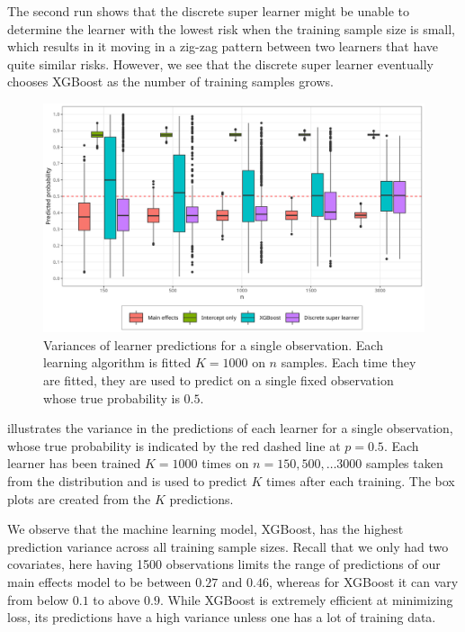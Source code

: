 \documentclass[./main.tex]{subfiles}
\begin{document}
The second run shows that the discrete super learner might be unable to determine the learner with the lowest risk when the training sample size is small, which results in it moving in a zig-zag pattern between two learners that have quite similar risks. However, we see that the discrete super learner eventually chooses XGBoost as the number of training samples grows.  

\begin{figure}[H]
    \centering
    \includegraphics[width=\textwidth]{figures/learner_vars.png}
    \caption{Variances of learner predictions for a single observation. Each learning algorithm is fitted $ K = 1000 $ on $n$ samples. Each time they are fitted, they are used to predict on a single fixed observation whose true probability is $ 0.5 $.}
    \label{fig:pred_probs_boxplot}
\end{figure}
 illustrates the variance in the predictions of each learner for a single observation, whose true probability is indicated by the red dashed line at $ p = 0.5 $. Each learner has been trained $ K = 1000 $ times on $ n = 150, 500, \dots 3000 $ samples taken from the distribution and is used to predict $ K $ times after each training. The box plots are created from the $ K $ predictions. 

We observe that the machine learning model, XGBoost, has the highest prediction variance across all training sample sizes. Recall that we only had two covariates, here having 1500 observations limits the range of predictions of our main effects model to be between $ 0.27 $ and $ 0.46 $, whereas for XGBoost it can vary from below $ 0.1 $ to above $ 0.9 $. While XGBoost is extremely efficient at minimizing loss, its predictions have a high variance unless one has a lot of training data. 
\end{document}
